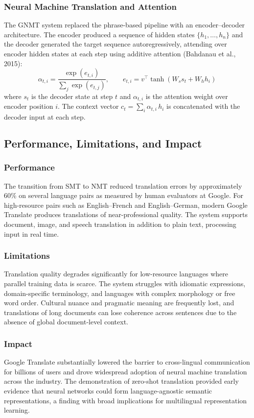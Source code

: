 \documentclass[11pt,a4paper]{report}
\begin{document}
\subsubsection{Neural Machine Translation and Attention}
The GNMT system replaced the phrase-based pipeline with an encoder--decoder architecture. The encoder produced a
sequence of hidden states $\{h_1, \ldots, h_n\}$ and the decoder generated the target sequence autoregressively,
attending over encoder hidden states at each step using additive attention (Bahdanau et al., 2015):
\[
\alpha_{t,i} = \frac{\exp(e_{t,i})}{\sum_{j}\exp(e_{t,j})}, \qquad e_{t,i} = v^\top \tanh(W_s s_t + W_h h_i)
\]
where $s_t$ is the decoder state at step $t$ and $\alpha_{t,i}$ is the attention weight over encoder position $i$.
The context vector $c_t = \sum_i \alpha_{t,i}\, h_i$ is concatenated with the decoder input at each step.

\subsection{Performance, Limitations, and Impact}

\subsubsection{Performance}
The transition from SMT to NMT reduced translation errors by approximately 60\% on several language pairs as
measured by human evaluators at Google. For high-resource pairs such as English--French and English--German,
modern Google Translate produces translations of near-professional quality. The system supports document, image,
and speech translation in addition to plain text, processing input in real time.

\subsubsection{Limitations}
Translation quality degrades significantly for low-resource languages where parallel training data is scarce.
The system struggles with idiomatic expressions, domain-specific terminology, and languages with complex
morphology or free word order. Cultural nuance and pragmatic meaning are frequently lost, and translations of
long documents can lose coherence across sentences due to the absence of global document-level context.

\subsubsection{Impact}
Google Translate substantially lowered the barrier to cross-lingual communication for billions of users and drove
widespread adoption of neural machine translation across the industry. The demonstration of zero-shot translation
provided early evidence that neural networks could form language-agnostic semantic representations, a finding
with broad implications for multilingual representation learning.
\end{document}
